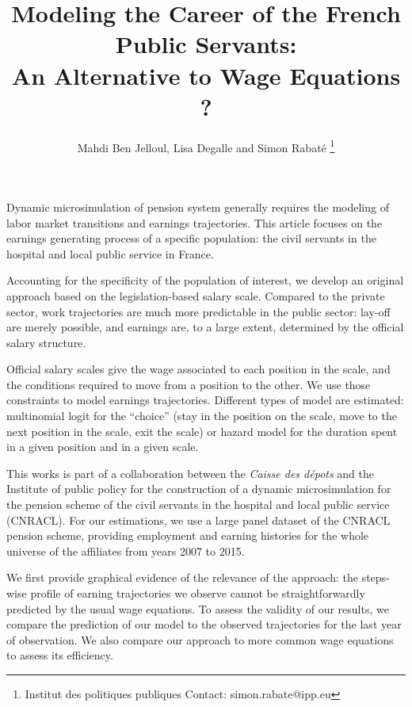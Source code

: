 \documentclass[11pt,a4paper]{article}
\begin{document}
\title{Modeling the Career of the French Public Servants: \\ An Alternative to Wage Equations ?}


\author{Mahdi Ben Jelloul, Lisa Degalle and Simon Rabat\'e \thanks{Institut des politiques publiques \newline Contact: simon.rabate@ipp.eu}}


\maketitle

Dynamic microsimulation of pension system generally requires the modeling of labor market transitions and earnings trajectories. This article focuses on the earnings generating process of a specific population: the civil servants in the hospital and local public service in France. 

Accounting for the specificity of the population of interest, we develop an original approach 
based on the legislation-based salary scale. Compared to the private sector, work trajectories are much more predictable in the public sector: lay-off are merely possible, and earnings are, to a large extent, determined by the official salary structure. 

Official salary scales give the wage associated to each position in the scale, and the conditions required to move from a position to the other. We use those constraints to model earnings trajectories. Different types of model are estimated: multinomial logit for the ``choice'' (stay in the position on the scale, move to the next position in the scale, exit the scale) or hazard model for the duration spent in a given position and in a given scale. 

This works is part of a collaboration between the \textit{Caisse des d\'epots} and the Institute of public policy for the construction of a dynamic microsimulation for the pension scheme of  the civil servants in the hospital and local public service (CNRACL). 
For our estimations, we use a large panel dataset of the CNRACL pension scheme, providing employment and earning histories for the whole universe of the affiliates from years 2007 to 2015. 

We first provide graphical evidence of the relevance of the approach: the steps-wise profile of earning trajectories we observe cannot be straightforwardly predicted by the usual wage equations. To assess the validity of our results, we compare the prediction of our model to the observed trajectories for the last year of observation. We also compare our approach to more common wage equations to assess its efficiency.
\end{document}
